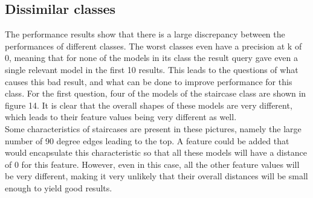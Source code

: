 \documentclass{bigdata}
\begin{document}
\subsection{Dissimilar classes}
The performance results show that there is a large discrepancy between the performances of different classes. The worst classes even have a precision at k of 0, meaning that for none of the models in its class the result query gave even a single relevant model in the first 10 results. This leads to the questions of what causes this bad result, and what can be done to improve performance for this class. For the first question, four of the models of the staircase class are shown in figure 14. It is clear that the overall shapes of these models are very different, which leads to their feature values being very different as well. \\
Some characteristics of staircases are present in these pictures, namely the large number of 90 degree edges leading to the top. A feature could be added that would encapsulate this characteristic so that all these models will have a distance of 0 for this feature. However, even in this case, all the other feature values will be very different, making it very unlikely that their overall distances will be small enough to yield good results.
\end{document}
